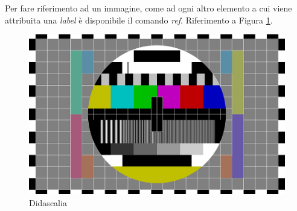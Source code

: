 Per fare riferimento ad un immagine, come ad ogni altro elemento a cui viene attribuita una \textit{label} è disponibile il comando \textit{ref}. Riferimento a Figura \ref{fig:figura_test}.
\begin{figure}[!h]
\centering
\includegraphics[scale=0.4]{images/test.png}
\caption{Didascalia}
\label{fig:figura_test}
\end{figure}